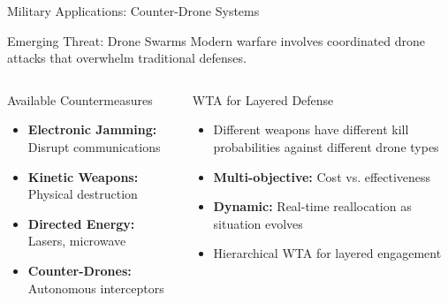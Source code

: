 \documentclass[aspectratio=43,8pt]{beamer}
\begin{document}
\begin{frame}{Military Applications: Counter-Drone Systems}
\begin{exampleblock}{Emerging Threat: Drone Swarms}
Modern warfare involves coordinated drone attacks that overwhelm traditional defenses.
\end{exampleblock}

\vspace{0.3cm}
\begin{columns}[t]
\begin{block}{Available Countermeasures}
\begin{itemize}
    \item \textbf{Electronic Jamming:} Disrupt communications
    \item \textbf{Kinetic Weapons:} Physical destruction
    \item \textbf{Directed Energy:} Lasers, microwave
    \item \textbf{Counter-Drones:} Autonomous interceptors
\end{itemize}
\end{block}

\begin{alertblock}{WTA for Layered Defense}
\begin{itemize}
    \item Different weapons have different kill probabilities against different drone types
    \item \textbf{Multi-objective:} Cost vs. effectiveness
    \item \textbf{Dynamic:} Real-time reallocation as situation evolves
    \item Hierarchical WTA for layered engagement
\end{itemize}
\end{alertblock}
\end{columns}
\end{frame}
\end{document}
